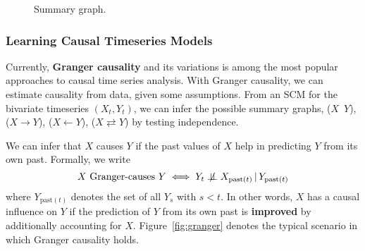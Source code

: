 \documentclass{article}
\newcommand{\giv}{\,|\,}
\newcommand{\indep}{\perp \!\!\! \perp}
\newcommand{\dep}{\centernot{\indep}}
\begin{document}
\begin{figure}[H]
    \centering
    \caption{Summary graph. }
    \label{fig:summary_graph}
\end{figure}

\subsubsection{Learning Causal Timeseries Models}

Currently, \textbf{Granger causality} and its variations is among the most popular approaches to causal time series analysis. With Granger causality, we can estimate causality from data, given some assumptions. From an SCM for the bivariate timeseries $(X_t, Y_t)$, we can infer the possible summary graphs, ($X\,\,\,Y$), ($X \rightarrow Y$), ($X \leftarrow Y$), ($X \rightleftarrows Y$) by testing independence. 

We can infer that $X$ causes $Y$ if the past values of $X$ help in predicting $Y$ from its own past. Formally, we write
$$
    X \text{ Granger-causes } Y \iff Y_t \dep X_{\text{past}(t)} \giv Y_{\text{past}(t)}
$$
\noindent where $Y_{\text{past}(t)}$ denotes the set of all $Y_s$ with $s < t$. In other words, $X$ has a causal influence on $Y$ if the prediction of $Y$ from its own past is \textbf{improved} by additionally accounting for $X$. Figure~\ref{fig:granger} denotes the typical scenario in which Granger causality holds. 
\end{document}
